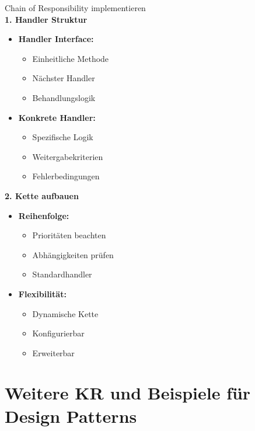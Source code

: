 \begin{KR}{Chain of Responsibility implementieren}\\
\textbf{1. Handler Struktur}
\begin{itemize}
    \item \textbf{Handler Interface:}
    \begin{itemize}
        \item Einheitliche Methode
        \item Nächster Handler
        \item Behandlungslogik
    \end{itemize}
    
    \item \textbf{Konkrete Handler:}
    \begin{itemize}
        \item Spezifische Logik
        \item Weitergabekriterien
        \item Fehlerbedingungen
    \end{itemize}
\end{itemize}

\textbf{2. Kette aufbauen}
\begin{itemize}
    \item \textbf{Reihenfolge:}
    \begin{itemize}
        \item Prioritäten beachten
        \item Abhängigkeiten prüfen
        \item Standardhandler
    \end{itemize}
    
    \item \textbf{Flexibilität:}
    \begin{itemize}
        \item Dynamische Kette
        \item Konfigurierbar
        \item Erweiterbar
    \end{itemize}
\end{itemize}
\end{KR}

\section{Weitere KR und Beispiele für Design Patterns}

